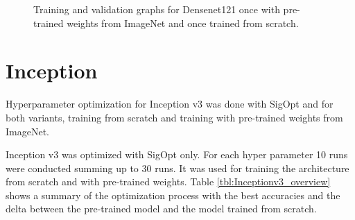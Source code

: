 \begin{figure}[h]
\centering
\caption{Training and validation graphs for Densenet121 once with pre-trained weights from ImageNet and once trained from scratch.}
\label{fig:densenet121-graph}
\end{figure}












\section{Inception}


Hyperparameter optimization for Inception v3 was done with SigOpt and for both variants, training from scratch and training with pre-trained weights from ImageNet.

Inception v3 was optimized with SigOpt only. For each hyper parameter 10 runs were conducted summing up to 30 runs. It was used for training the architecture from scratch and with pre-trained weights. Table \ref{tbl:Inceptionv3_overview} shows a summary of the optimization process with the best accuracies and the delta between the pre-trained model and the model trained from scratch.

